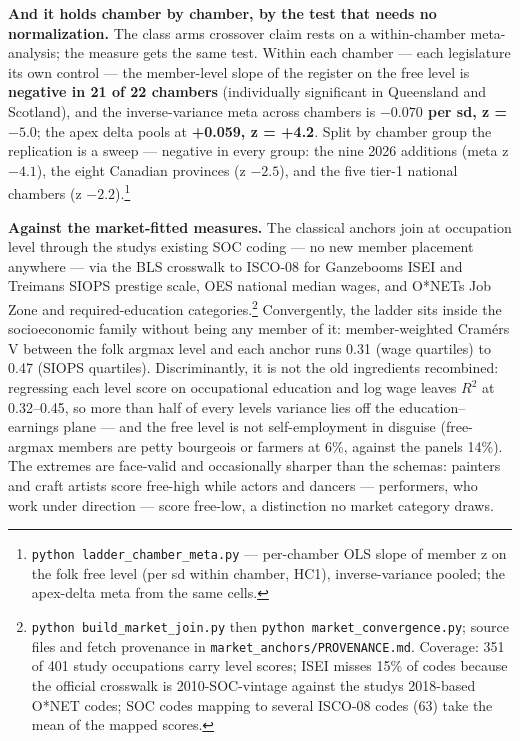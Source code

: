 \textbf{And it holds chamber by chamber, by the test that needs no
normalization.} The class arm\textquotesingle s crossover claim rests on a within-chamber
meta-analysis; the measure gets the same test. Within each chamber --- each
legislature its own control --- the member-level slope of the register on the
free level is \textbf{negative in 21 of 22 chambers} (individually significant
in Queensland and Scotland), and the inverse-variance meta across chambers
is \textbf{\(-0.070\) per sd, z = \(-5.0\)}; the apex delta pools at \textbf{+0.059, z =
+4.2}. Split by chamber group the replication is a sweep --- negative in every
group: the nine 2026 additions (meta z \(-4.1\)), the eight Canadian provinces
(z \(-2.5\)), and the five tier-1 national chambers (z \(-2.2\)).\footnote{\texttt{python\ ladder\_\allowbreak{}chamber\_\allowbreak{}meta.\allowbreak{}py} --- per-chamber OLS slope of
  member z on the folk free level (per sd within chamber, HC1),
  inverse-variance pooled; the apex-delta meta from the same cells.}

\textbf{Against the market-fitted measures.} The classical anchors join at
occupation level through the study\textquotesingle s existing SOC coding --- no new member
placement anywhere --- via the BLS crosswalk to ISCO-08 for Ganzeboom\textquotesingle s ISEI
and Treiman\textquotesingle s SIOPS prestige scale, OES national median wages, and O*NET\textquotesingle s
Job Zone and required-education categories.\footnote{\texttt{python\ build\_\allowbreak{}market\_\allowbreak{}join.\allowbreak{}py} then
  \texttt{python\ market\_\allowbreak{}convergence.\allowbreak{}py}; source files and fetch provenance in
  \texttt{market\_\allowbreak{}anchors/\allowbreak{}PROVENANCE.\allowbreak{}md}. Coverage: 351 of 401 study occupations
  carry level scores; ISEI misses 15\% of codes because the official
  crosswalk is 2010-SOC-vintage against the study\textquotesingle s 2018-based O*NET
  codes; SOC codes mapping to several ISCO-08 codes (63) take the mean
  of the mapped scores.} Convergently, the
ladder sits inside the socioeconomic family without being any member of
it: member-weighted Cramér\textquotesingle s V between the folk argmax level and each
anchor runs 0.31 (wage quartiles) to 0.47 (SIOPS quartiles). Discriminantly,
it is not the old ingredients recombined: regressing each level score on
occupational education and log wage leaves \(R^{2}\) at 0.32--0.45, so more than
half of every level\textquotesingle s variance lies off the education--earnings plane --- and
the free level is not self-employment in disguise (free-argmax members are
petty bourgeois or farmers at 6\%, against the panel\textquotesingle s 14\%). The extremes
are face-valid and occasionally sharper than the schemas: painters and
craft artists score free-high while actors and dancers --- performers, who
work under direction --- score free-low, a distinction no market category
draws.

